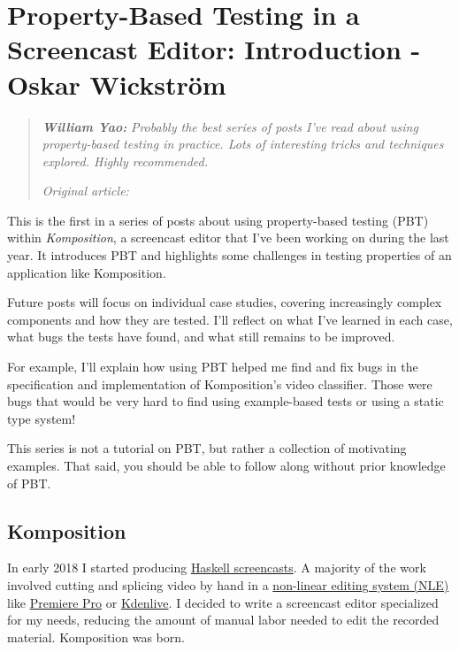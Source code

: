 \chapter{Property-Based Testing in a Screencast Editor: Introduction - Oskar Wickstr\"om}
\label{sec:screencast_introduction}


\begin{quotation}
\noindent\textit{\textbf{William Yao:}}
\textit{Probably the best series of posts I've read about using property-based testing in practice. Lots of interesting tricks and techniques explored. Highly recommended.}

\vspace{\baselineskip}
\noindent\textit{Original article: \cite{screencast_introduction}}
\end{quotation}
This is the first in a series of posts about using property-based testing (PBT) within \textit{Komposition}, a screencast editor that I've been working on during the last year. It introduces PBT and highlights some challenges in testing properties of an application like Komposition.

Future posts will focus on individual case studies, covering increasingly complex components and how they are tested. I'll reflect on what I've learned in each case, what bugs the tests have found, and what still remains to be improved.

For example, I'll explain how using PBT helped me find and fix bugs in the specification and implementation of Komposition's video classifier. Those were bugs that would be very hard to find using example-based tests or using a static type system!

This series is not a tutorial on PBT, but rather a collection of motivating examples. That said, you should be able to follow along without prior knowledge of PBT.

\section{Komposition}


In early 2018 I started producing \href{https://haskell-at-work.com/}{Haskell screencasts}. A majority of the work involved cutting and splicing video by hand in a \href{https://en.wikipedia.org/wiki/Non-linear_editing_system}{non-linear editing system (NLE)} like \href{https://en.wikipedia.org/wiki/Adobe_Premiere_Pro}{Premiere Pro} or \href{https://kdenlive.org/en/}{Kdenlive}. I decided to write a screencast editor specialized for my needs, reducing the amount of manual labor needed to edit the recorded material. Komposition was born.

